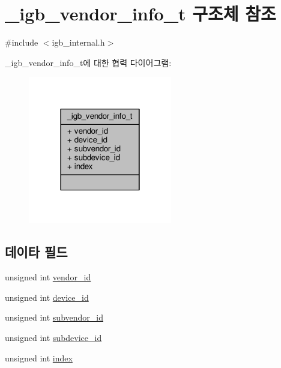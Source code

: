 \hypertarget{struct__igb__vendor__info__t}{}\section{\+\_\+igb\+\_\+vendor\+\_\+info\+\_\+t 구조체 참조}
\label{struct__igb__vendor__info__t}


{\ttfamily \#include $<$igb\+\_\+internal.\+h$>$}



\+\_\+igb\+\_\+vendor\+\_\+info\+\_\+t에 대한 협력 다이어그램\+:
\nopagebreak
\begin{figure}[H]
\begin{center}
\leavevmode
\includegraphics[width=178pt]{struct__igb__vendor__info__t__coll__graph}
\end{center}
\end{figure}
\subsection*{데이타 필드}
\begin{DoxyCompactItemize}
\item 
unsigned int \hyperlink{struct__igb__vendor__info__t_a39273a5704a715a766f66c08e9b2437c}{vendor\+\_\+id}
\item 
unsigned int \hyperlink{struct__igb__vendor__info__t_a2d805c7d6d45d66052531bff7b2aa1ab}{device\+\_\+id}
\item 
unsigned int \hyperlink{struct__igb__vendor__info__t_a6858d2c34fb8ee4d1070bbabb24f582d}{subvendor\+\_\+id}
\item 
unsigned int \hyperlink{struct__igb__vendor__info__t_a9b21d242993dc26b9ca0819c57de4159}{subdevice\+\_\+id}
\item 
unsigned int \hyperlink{struct__igb__vendor__info__t_a589d64202487f78e3cc30dd2e04c5201}{index}
\end{DoxyCompactItemize}



